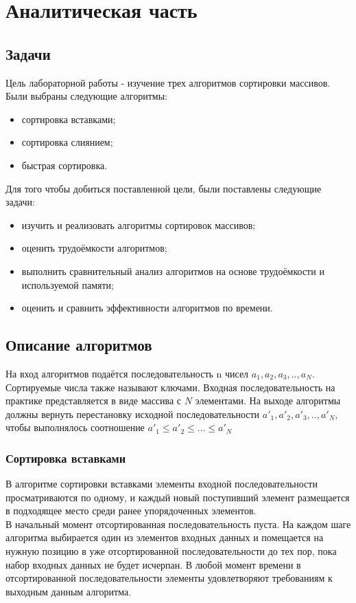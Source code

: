 \documentclass[12pt, a4paper]{report}
\begin{document}
    \chapter{Аналитическая часть}
	\section{Задачи}
	Цель лабораторной работы - изучение трех алгоритмов сортировки массивов. Были выбраны следующие алгоритмы:
	\begin{itemize}
		\item сортировка вставками;
		\item сортировка слиянием;
		\item быстрая сортировка.
	\end{itemize}
	Для того чтобы добиться поставленной цели, были поставлены следующие задачи:
	\begin{itemize}
		\item изучить и реализовать алгоритмы сортировок массивов;
		\item оценить трудоёмкости алгоритмов;
		\item выполнить сравнительный анализ алгоритмов на основе трудоёмкости и используемой памяти;
		\item оценить и сравнить эффективности алгоритмов по времени.
	\end{itemize}

	\section{Описание алгоритмов}
	На вход алгоритмов подаётся последовательность n чисел $a_1, a_2, a_3,.., a_N$. Сортируемые числа также называют ключами. Входная последовательность на практике представляется в виде массива с $N$	элементами. На выходе алгоритмы должны вернуть перестановку исходной последовательности $a'_1, a'_2, a'_3,.., a'_N$, чтобы выполнялось соотношение $a'_1 \leq a'_2 \leq ...\leq a'_N$\\
	
	\subsection{Сортировка вставками}
	В алгоритме сортировки вставками элементы входной последовательности просматриваются по одному, и каждый новый поступивший элемент размещается в подходящее место среди ранее упорядоченных элементов.\\
	В начальный момент отсортированная последовательность пуста. На каждом шаге алгоритма выбирается один из элементов входных данных и помещается на нужную позицию в уже отсортированной последовательности до тех пор, пока набор входных данных не будет исчерпан. В любой момент времени в отсортированной последовательности элементы удовлетворяют требованиям к выходным данным алгоритма.
\end{document}
